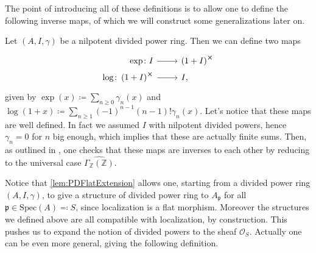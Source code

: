 \noindent
The point of introducing all of these definitions is to allow one to define the following
inverse maps, of which we will construct some generalizations later on.
\begin{defn}[]\label{defn:PDExponential}
	Let $\left(A, I, \gamma\right)$ be a nilpotent divided power ring.
	Then we can define two maps
	\begin{equation*}
	\begin{tikzcd}[row sep = 0ex
		,/tikz/column 1/.append style={anchor=base east}
		,/tikz/column 2/.append style={anchor=base west}]
		\exp\colon I \arrow[r, "", rightarrow] &
		\left( 1 + I \right)^{\cross}\\
		\log\colon \left( 1 + I \right)^{\cross} \arrow[r, "", rightarrow] &
		I
	,\end{tikzcd}
	\end{equation*} 
	given by 
	$\exp (x) \coloneqq \sum_{n\geq 0} \gamma_n(x)$
	and $\log (1+x) \coloneqq \sum_{n\geq 1} 
	(-1)^{n-1} \left( n-1 \right)! \gamma_n(x)$.
	Let's notice that these maps are well defined.
	In fact we assumed $I$ with nilpotent divided powers,
	hence $\gamma_n = 0$ for $n$ big enough, which implies that
	these are actually finite sums.
	Then, as outlined in \cite[Chapter III, \S1.6]{Messing},
	one checks that these maps are inverses to each other
	by reducing to the universal case $\widehat{\Gamma_{\mathbb{Z}}(\mathbb{Z})}$.
\end{defn}


\begin{rem}[]
	Notice that \cref{lem:PDFlatExtension} allows one, starting from
	a divided power ring $\left(A, I, \gamma\right)$, to give
	a structure of divided power ring to $A_{\mathfrak{p}}$ for all
	$\mathfrak{p} \in \mathrm{Spec}(A) \eqqcolon S$, since localization is a flat morphism.
	Moreover the structures we defined above are all compatible with localization, by construction.
	This pushes us to expand the notion of divided powers to the
	sheaf $\mathcal{O}_{ S }$.
	Actually one can be even more general, giving the following definition.
\end{rem}


